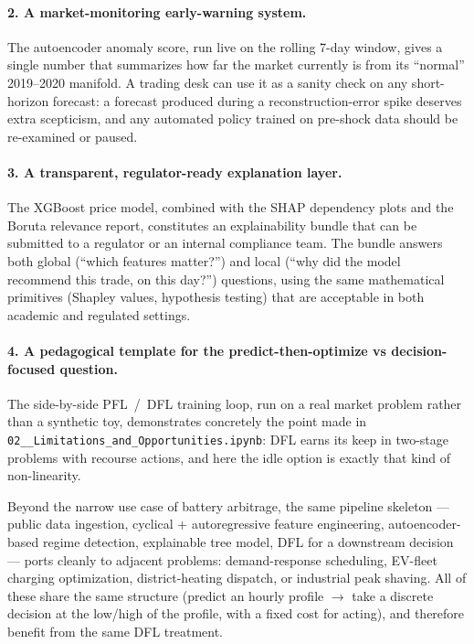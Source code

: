\documentclass[11pt,a4paper]{article}
\newcommand{\code}[1]{\allowbreak\texttt{\small #1}\allowbreak}
\begin{document}
\paragraph{2. A market-monitoring early-warning system.}
The autoencoder anomaly score, run live on the rolling 7-day window,
gives a single number that summarizes how far the market currently is
from its ``normal'' 2019--2020 manifold. A trading desk can use it as a
sanity check on any short-horizon forecast: a forecast produced during
a reconstruction-error spike deserves extra scepticism, and any
automated policy trained on pre-shock data should be re-examined or
paused.

\paragraph{3. A transparent, regulator-ready explanation layer.}
The XGBoost price model, combined with the SHAP dependency plots and
the Boruta relevance report, constitutes an explainability bundle that
can be submitted to a regulator or an internal compliance team. The
bundle answers both global (``which features matter?'') and local
(``why did the model recommend this trade, on this day?'') questions,
using the same mathematical primitives (Shapley values, hypothesis
testing) that are acceptable in both academic and regulated settings.

\paragraph{4. A pedagogical template for the
predict-then-optimize vs decision-focused question.}
The side-by-side PFL~/~DFL training loop, run on a real market problem
rather than a synthetic toy, demonstrates concretely the point made in
\code{02\_\_Limitations\_and\_Opportunities.ipynb}: DFL earns its keep
in two-stage problems with recourse actions, and here the idle option
is exactly that kind of non-linearity.

\bigskip
Beyond the narrow use case of battery arbitrage, the same pipeline
skeleton --- public data ingestion, cyclical + autoregressive feature
engineering, autoencoder-based regime detection, explainable tree
model, DFL for a downstream decision --- ports cleanly to adjacent
problems: demand-response scheduling, EV-fleet charging optimization,
district-heating dispatch, or industrial peak shaving. All of these
share the same structure (predict an hourly profile $\rightarrow$ take
a discrete decision at the low/high of the profile, with a fixed cost
for acting), and therefore benefit from the same DFL treatment.
\end{document}
